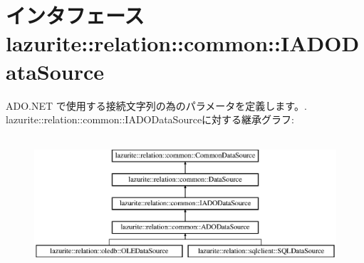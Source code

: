 \hypertarget{interfacelazurite_1_1relation_1_1common_1_1_i_a_d_o_data_source}{
\section{インタフェース lazurite::relation::common::IADODataSource}
\label{interfacelazurite_1_1relation_1_1common_1_1_i_a_d_o_data_source}
}


ADO.NET で使用する接続文字列の為のパラメータを定義します。.  
lazurite::relation::common::IADODataSourceに対する継承グラフ:\begin{figure}[H]
\begin{center}
\leavevmode
\includegraphics[height=4.96454cm]{interfacelazurite_1_1relation_1_1common_1_1_i_a_d_o_data_source}
\end{center}
\end{figure}
